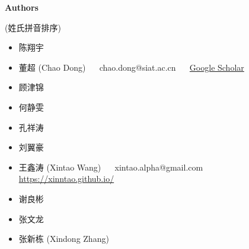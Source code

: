 \documentclass[../main.tex]{subfiles}
\begin{document}
\newpage

{\Large\textbf{Authors}} 

(姓氏拼音排序)

\begin{itemize}
	\item 陈翔宇
	\item 董超 (Chao Dong) ~~ chao.dong@siat.ac.cn ~~
	 \href{https://scholar.google.com.hk/citations?user=OSDCB0UAAAAJ}{Google Scholar}
	\item 顾津锦
	\item 何静雯
	\item 孔祥涛
	\item 刘翼豪
	\item 王鑫涛 (Xintao Wang) ~~ xintao.alpha@gmail.com ~~ \url{https://xinntao.github.io/}
	\item 谢良彬
	\item 张文龙
	\item 张新栋 (Xindong Zhang)
\end{itemize}
\end{document}
